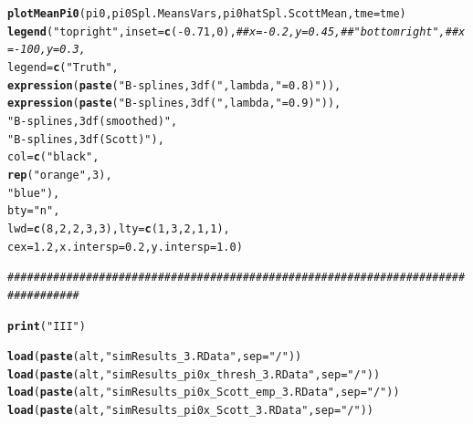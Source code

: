 \documentclass{article}\usepackage[]{graphicx}\usepackage[]{color}
\makeatletter
\newcommand{\hlnum}[1]{\textcolor[rgb]{0.686,0.059,0.569}{#1}}%
\newcommand{\hlstr}[1]{\textcolor[rgb]{0.192,0.494,0.8}{#1}}%
\newcommand{\hlcom}[1]{\textcolor[rgb]{0.678,0.584,0.686}{\textit{#1}}}%
\newcommand{\hlopt}[1]{\textcolor[rgb]{0,0,0}{#1}}%
\newcommand{\hlstd}[1]{\textcolor[rgb]{0.345,0.345,0.345}{#1}}%
\newcommand{\hlkwc}[1]{\textcolor[rgb]{0.333,0.667,0.333}{#1}}%
\newcommand{\hlkwd}[1]{\textcolor[rgb]{0.737,0.353,0.396}{\textbf{#1}}}%
\newenvironment{kframe}{%
 \def\at@end@of@kframe{}%
 \ifinner\ifhmode%
  \def\at@end@of@kframe{\end{minipage}}%
  \begin{minipage}{\columnwidth}%
 \fi\fi%
 \def\FrameCommand##1{\hskip\@totalleftmargin \hskip-\fboxsep
 \colorbox{shadecolor}{##1}\hskip-\fboxsep
     \hskip-\linewidth \hskip-\@totalleftmargin \hskip\columnwidth}%
 \MakeFramed {\advance\hsize-\width
   \@totalleftmargin\z@ \linewidth\hsize
   \@setminipage}}%
 {\par\unskip\endMakeFramed%
 \at@end@of@kframe}
\newenvironment{knitrout}{}{} %
\makeatother
\begin{document}
\begin{knitrout}
\begin{kframe}
\begin{alltt}
  \hlkwd{plotMeanPi0}\hlstd{(pi0, pi0Spl.MeansVars, pi0hatSpl.ScottMean,} \hlkwc{tme}\hlstd{=tme)}
  \hlkwd{legend}\hlstd{(}\hlstr{"topright"}\hlstd{,} \hlkwc{inset}\hlstd{=}\hlkwd{c}\hlstd{(}\hlopt{-}\hlnum{0.71}\hlstd{,}\hlnum{0}\hlstd{),}\hlcom{##x=-0.2, y=0.45,##"bottomright", ##x=-100, y=0.3, }
         \hlkwc{legend}\hlstd{=}\hlkwd{c}\hlstd{(}\hlstr{"Truth"}\hlstd{,}
                  \hlkwd{expression}\hlstd{(}\hlkwd{paste}\hlstd{(}\hlstr{"B-splines, 3 df ("}\hlstd{, lambda,} \hlstr{"=0.8)"}\hlstd{)),}
                  \hlkwd{expression}\hlstd{(}\hlkwd{paste}\hlstd{(}\hlstr{"B-splines, 3 df ("}\hlstd{, lambda,} \hlstr{"=0.9)"}\hlstd{)),}
                  \hlstr{"B-splines, 3 df (smoothed)"}\hlstd{,}
                  \hlstr{"B-splines, 3 df (Scott)"}\hlstd{),}
         \hlkwc{col}\hlstd{=}\hlkwd{c}\hlstd{(}\hlstr{"black"}\hlstd{,}
               \hlkwd{rep}\hlstd{(}\hlstr{"orange"}\hlstd{,}\hlnum{3}\hlstd{),}
               \hlstr{"blue"}\hlstd{),}
         \hlkwc{bty}\hlstd{=}\hlstr{"n"}\hlstd{,}
         \hlkwc{lwd}\hlstd{=}\hlkwd{c}\hlstd{(}\hlnum{8}\hlstd{,}\hlnum{2}\hlstd{,}\hlnum{2}\hlstd{,}\hlnum{3}\hlstd{,}\hlnum{3}\hlstd{),} \hlkwc{lty}\hlstd{=}\hlkwd{c}\hlstd{(}\hlnum{1}\hlstd{,}\hlnum{3}\hlstd{,}\hlnum{2}\hlstd{,}\hlnum{1}\hlstd{,}\hlnum{1}\hlstd{),}
         \hlkwc{cex}\hlstd{=}\hlnum{1.2}\hlstd{,} \hlkwc{x.intersp}\hlstd{=}\hlnum{0.2}\hlstd{,} \hlkwc{y.intersp}\hlstd{=}\hlnum{1.0}\hlstd{)}

    \hlcom{#################################################################################}

    \hlkwd{print}\hlstd{(}\hlstr{"III"}\hlstd{)}

  \hlkwd{load}\hlstd{(}\hlkwd{paste}\hlstd{(alt,}\hlstr{"simResults_3.RData"}\hlstd{,}\hlkwc{sep}\hlstd{=}\hlstr{"/"}\hlstd{))}
  \hlkwd{load}\hlstd{(}\hlkwd{paste}\hlstd{(alt,}\hlstr{"simResults_pi0x_thresh_3.RData"}\hlstd{,}\hlkwc{sep}\hlstd{=}\hlstr{"/"}\hlstd{))}
  \hlkwd{load}\hlstd{(}\hlkwd{paste}\hlstd{(alt,}\hlstr{"simResults_pi0x_Scott_emp_3.RData"}\hlstd{,}\hlkwc{sep}\hlstd{=}\hlstr{"/"}\hlstd{))}
  \hlkwd{load}\hlstd{(}\hlkwd{paste}\hlstd{(alt,}\hlstr{"simResults_pi0x_Scott_3.RData"}\hlstd{,}\hlkwc{sep}\hlstd{=}\hlstr{"/"}\hlstd{))}


\end{alltt}
\end{kframe}
\end{knitrout}
\end{document}
